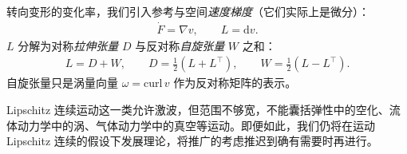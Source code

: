 \documentclass[../../main.tex]{subfiles}
\begin{document}
转向变形的变化率，我们引入参考与空间\emph{速度梯度}（它们实际上是微分）：
\begin{align}
\dot{F}=\nabla v,\qquad L=\mathrm{d}v.
\label{align:ch02-2-1-8}
\end{align}
$L$ 分解为对称\emph{拉伸张量} $D$ 与反对称\emph{自旋张量} $W$ 之和：
\begin{align}
L=D+W,\qquad D=\tfrac{1}{2}(L+L^{\top}),\qquad W=\tfrac{1}{2}(L-L^{\top}).
\label{align:ch02-2-1-9}
\end{align}
自旋张量只是涡量向量 $\omega=\mathrm{curl}\,v$ 作为反对称矩阵的表示。

Lipschitz 连续运动这一类允许激波，但范围不够宽，不能囊括弹性中的空化、流体动力学中的涡、气体动力学中的真空等运动。即便如此，我们仍将在运动 Lipschitz 连续的假设下发展理论，将推广的考虑推迟到确有需要时再进行。
\end{document}
